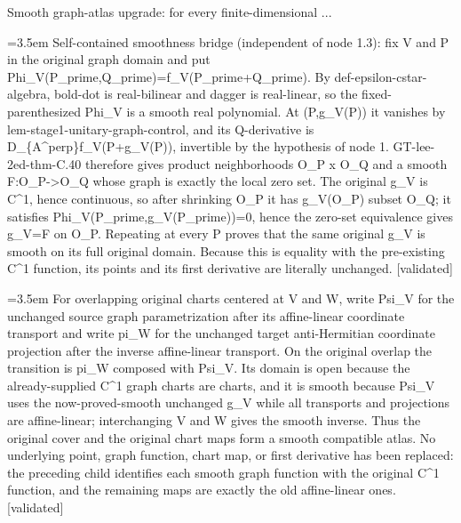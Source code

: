 \documentclass{article}
\newcommand{\step}[1]{\par\noindent\hangindent=3.5em\hangafter=1%
  \makebox[3.5em][l]{\textbf{#1.}}}
\newcommand{\steptag}[1]{\hfill{\small\textsf{[#1]}}}
\begin{document}
\begin{proofbox}{Smooth graph-atlas upgrade: for every finite-dimensional ...}
\step{1.4.2.1} Self-contained smoothness bridge (independent of node 1.3): fix V and P in the original graph domain and put Phi\_V(P\_prime,Q\_prime)=f\_V(P\_prime+Q\_prime). By def-epsilon-cstar-algebra, bold-dot is real-bilinear and dagger is real-linear, so the fixed-parenthesized Phi\_V is a smooth real polynomial. At (P,g\_V(P)) it vanishes by lem-stage1-unitary-graph-control, and its Q-derivative is D\_\{A\textasciicircum{}perp\}f\_V(P+g\_V(P)), invertible by the hypothesis of node 1. GT-lee-2ed-thm-C.40 therefore gives product neighborhoods O\_P x O\_Q and a smooth F:O\_P->O\_Q whose graph is exactly the local zero set. The original g\_V is C\textasciicircum{}1, hence continuous, so after shrinking O\_P it has g\_V(O\_P) subset O\_Q; it satisfies Phi\_V(P\_prime,g\_V(P\_prime))=0, hence the zero-set equivalence gives g\_V=F on O\_P. Repeating at every P proves that the same original g\_V is smooth on its full original domain. Because this is equality with the pre-existing C\textasciicircum{}1 function, its points and its first derivative are literally unchanged. \steptag{validated} \\[4pt]
\step{1.4.2.2} For overlapping original charts centered at V and W, write Psi\_V for the unchanged source graph parametrization after its affine-linear coordinate transport and write pi\_W for the unchanged target anti-Hermitian coordinate projection after the inverse affine-linear transport. On the original overlap the transition is pi\_W composed with Psi\_V. Its domain is open because the already-supplied C\textasciicircum{}1 graph charts are charts, and it is smooth because Psi\_V uses the now-proved-smooth unchanged g\_V while all transports and projections are affine-linear; interchanging V and W gives the smooth inverse. Thus the original cover and the original chart maps form a smooth compatible atlas. No underlying point, graph function, chart map, or first derivative has been replaced: the preceding child identifies each smooth graph function with the original C\textasciicircum{}1 function, and the remaining maps are exactly the old affine-linear ones. \steptag{validated} \\[4pt]
\end{proofbox}
\end{document}
